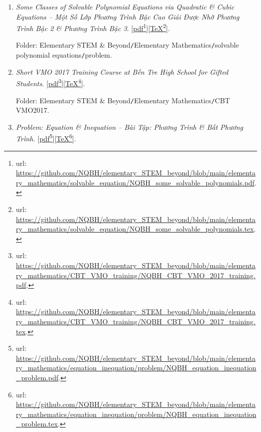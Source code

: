 \documentclass[12pt,twoside]{book}
\begin{document}
\begin{enumerate}
	\item {\it Some Classes of Solvable Polynomial Equations via Quadratic \& Cubic Equations -- Một Số Lớp Phương Trình Bậc Cao Giải Được Nhờ Phương Trình Bậc 2 \& Phương Trình Bậc 3}. [\href{https://github.com/NQBH/elementary_STEM_beyond/blob/main/elementary_mathematics/solvable_equation/NQBH_some_solvable_polynomials.pdf}{pdf}\footnote{{\sc url}: \url{https://github.com/NQBH/elementary_STEM_beyond/blob/main/elementary_mathematics/solvable_equation/NQBH_some_solvable_polynomials.pdf}.}][\href{https://github.com/NQBH/elementary_STEM_beyond/blob/main/elementary_mathematics/solvable_equation/NQBH_some_solvable_polynomials.tex}{\TeX}\footnote{{\sc url}: \url{https://github.com/NQBH/elementary_STEM_beyond/blob/main/elementary_mathematics/solvable_equation/NQBH_some_solvable_polynomials.tex}.}].
	
	Folder: {\sf Elementary STEM \& Beyond{\tt/}Elementary Mathematics{\tt/}solvable polynomial equations{\tt/}problem}.
	\item {\it Short VMO 2017 Training Course at Bến Tre High School for Gifted Students}. [\href{https://github.com/NQBH/elementary_STEM_beyond/blob/main/elementary_mathematics/CBT_VMO_training/NQBH_CBT_VMO_2017_training.pdf}{pdf}\footnote{{\sc url}: \url{https://github.com/NQBH/elementary_STEM_beyond/blob/main/elementary_mathematics/CBT_VMO_training/NQBH_CBT_VMO_2017_training.pdf}.}][\href{https://github.com/NQBH/elementary_STEM_beyond/blob/main/elementary_mathematics/CBT_VMO_training/NQBH_CBT_VMO_2017_training.tex}{\TeX}\footnote{{\sc url}: \url{https://github.com/NQBH/elementary_STEM_beyond/blob/main/elementary_mathematics/CBT_VMO_training/NQBH_CBT_VMO_2017_training.tex}.}].
	
	Folder: {\sf Elementary STEM \& Beyond{\tt/}Elementary Mathematics{\tt/}CBT VMO2017}.
	\item {\it Problem: Equation \& Inequation -- Bài Tập: Phương Trình \& Bất Phương Trình}. [\href{https://github.com/NQBH/elementary_STEM_beyond/blob/main/elementary_mathematics/equation_inequation/problem/NQBH_equation_inequation_problem.pdf}{pdf}\footnote{{\sc url}: \url{https://github.com/NQBH/elementary_STEM_beyond/blob/main/elementary_mathematics/equation_inequation/problem/NQBH_equation_inequation_problem.pdf}.}][\href{https://github.com/NQBH/elementary_STEM_beyond/blob/main/elementary_mathematics/equation_inequation/problem/NQBH_equation_inequation_problem.tex}{\TeX}\footnote{{\sc url}: \url{https://github.com/NQBH/elementary_STEM_beyond/blob/main/elementary_mathematics/equation_inequation/problem/NQBH_equation_inequation_problem.tex}.}].
	

\end{enumerate}
\end{document}

